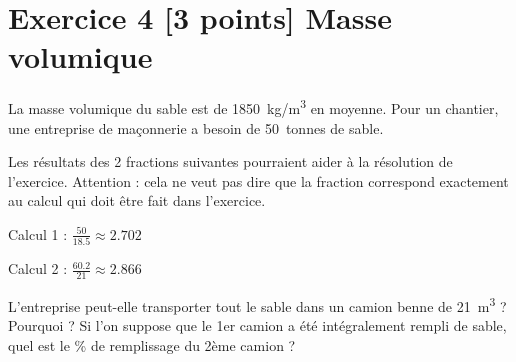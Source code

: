 \documentclass{exam}
\begin{document}
\section*{Exercice 4 [3 points] Masse volumique}

La masse volumique du sable est de \SI{1850}{kg/m^3} en moyenne. Pour un chantier, une entreprise de maçonnerie a besoin de \SI{50}{tonnes} de sable.

\begin{tcolorbox}[colback=blue!10!white, colframe=blue!70!black, title=Indication]
  Les résultats des 2 fractions suivantes pourraient aider à la résolution de l'exercice. Attention : cela ne veut pas dire que la fraction correspond exactement au calcul qui doit être fait dans l'exercice. \par
  \vspace{1em}
  Calcul 1 : $\frac{50}{18.5} \approx 2.702$ \par 
  \vspace{1em}
  Calcul 2 : $\frac{60.2}{21} \approx 2.866$
\end{tcolorbox}

\begin{questions}  
\question[2] L'entreprise peut-elle transporter tout le sable dans un camion benne de \SI{21}{m^3} ? Pourquoi ?
\question[1] Si l'on suppose que le 1er camion a été intégralement rempli de sable, quel est le \% de remplissage du 2ème camion ?
\end{questions}
\end{document}
